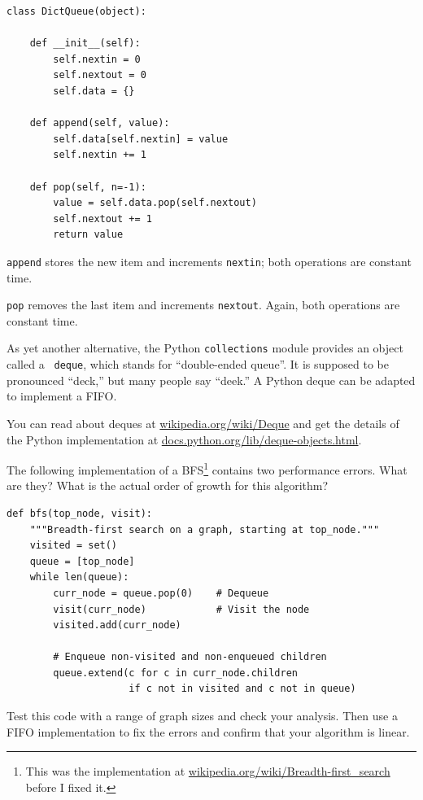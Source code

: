 \documentclass[10pt]{book}
\begin{document}
\begin{verbatim}
class DictQueue(object):

    def __init__(self):
        self.nextin = 0
        self.nextout = 0
        self.data = {}

    def append(self, value):
        self.data[self.nextin] = value
        self.nextin += 1

    def pop(self, n=-1):
        value = self.data.pop(self.nextout)
        self.nextout += 1
        return value
\end{verbatim}

{\tt append} stores the new item and increments {\tt nextin};
both operations are constant time.

{\tt pop} 
removes the last item and increments {\tt nextout}.  Again,
both operations are constant time.

As yet another alternative,
the Python {\tt collections} module provides an object called a {\tt
  deque}, which stands for ``double-ended queue''.  It is supposed to
be pronounced ``deck,'' but many people say ``deek.''  A Python deque
can be adapted to implement a FIFO.

You can read about deques at \url{wikipedia.org/wiki/Deque}
and get the details of the Python implementation at
\url{docs.python.org/lib/deque-objects.html}.


\begin{ex}

The following implementation of a BFS\footnote{This was the
  implementation at \url{wikipedia.org/wiki/Breadth-first_search}
  before I fixed it.}  contains two performance errors.  What are
they?  What is the actual order of growth for this algorithm?

\begin{verbatim}
def bfs(top_node, visit):
    """Breadth-first search on a graph, starting at top_node."""
    visited = set()
    queue = [top_node]
    while len(queue):
        curr_node = queue.pop(0)    # Dequeue
        visit(curr_node)            # Visit the node
        visited.add(curr_node)

        # Enqueue non-visited and non-enqueued children
        queue.extend(c for c in curr_node.children
                     if c not in visited and c not in queue)
\end{verbatim}

Test this code with a range of graph sizes and check your analysis.
Then use a FIFO implementation to fix the errors and confirm
that your algorithm is linear.

\end{ex}
\end{document}
